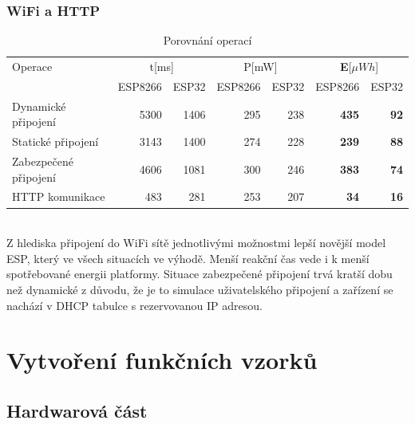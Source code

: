 \documentclass[a4paper, 12pt]{report}
\begin{document}
    \subsection{WiFi a HTTP}
    \begin{table}[h]
        \centering
        \caption{Porovnání operací}
        \begin{tabular}{||l| r r r r |r r||}
            \hline
            Operace & \multicolumn{2}{c}{t[ms]} & \multicolumn{2}{c}{P[mW]} & \multicolumn{2}{c||}{\textbf{E}[$\mu Wh$]} \\
            & ESP8266 & ESP32 & ESP8266 & ESP32 & ESP8266 & ESP32 \\
            \hline
            \hline
            Dynamické připojení   & 5300  & 1406    & 295  & 238     & \textbf{435}&\textbf{92}          \\
            Statické připojení    & 3143  & 1400    & 274  & 228     & \textbf{239}&\textbf{88}          \\
            Zabezpečené připojení & 4606  & 1081    & 300  & 246     & \textbf{383}&\textbf{74}          \\
            HTTP komunikace       & 483  & 281    & 253   & 207     & \textbf{34}&\textbf{16}          \\
            \hline
        \end{tabular}
        \label{tab:porovnani-spotreba-operaci}
    \end{table}\\
    Z hlediska připojení do WiFi sítě jednotlivými možnostmi lepší novější model ESP, který ve všech situacích ve výhodě. Menší reakční čas vede i k menší spotřebované energii platformy.
    Situace zabezpečené připojení trvá kratší dobu než dynamické z důvodu, že je to simulace uživatelského připojení a zařízení se nachází v DHCP tabulce s rezervovanou IP adresou.






    \chapter{Vytvoření funkčních vzorků}
    \section{Hardwarová část}
\end{document}
